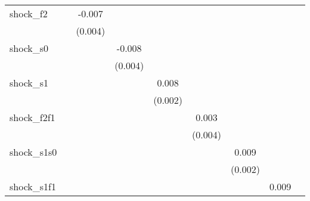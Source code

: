 {\begin{tabular}{l*{8}{c}}
\addlinespace
shock\_f2    &                     &      -0.007\sym{*}  &                     &                     &                     &                     &                     &                     \\
            &                     &     (0.004)         &                     &                     &                     &                     &                     &                     \\
\addlinespace
shock\_s0    &                     &                     &      -0.008\sym{**} &                     &                     &                     &                     &                     \\
            &                     &                     &     (0.004)         &                     &                     &                     &                     &                     \\
\addlinespace
shock\_s1    &                     &                     &                     &       0.008\sym{***}&                     &                     &                     &                     \\
            &                     &                     &                     &     (0.002)         &                     &                     &                     &                     \\
\addlinespace
shock\_f2f1  &                     &                     &                     &                     &       0.003         &                     &                     &                     \\
            &                     &                     &                     &                     &     (0.004)         &                     &                     &                     \\
\addlinespace
shock\_s1s0  &                     &                     &                     &                     &                     &       0.009\sym{***}&                     &                     \\
            &                     &                     &                     &                     &                     &     (0.002)         &                     &                     \\
\addlinespace
shock\_s1f1  &                     &                     &                     &                     &                     &                     &       0.009         &                     \\

\end{tabular}}
